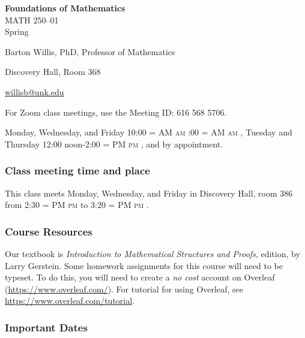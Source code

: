 \documentclass[12pt]{article}
\makeatletter
\newcounter{ex}\setcounter{ex}{0}
\renewenvironment{description}[0]{\begin{compactdesc}}{\end{compactdesc}}
\DeclareRobustCommand{\maybefakesc}[1]{%
  \ifnum\pdfstrcmp{\f@series}{\bfdefault}=\z@
    {\fontsize{\dimexpr0.8\dimexpr\f@size pt\relax}{0}\selectfont\uppercase{#1}}%
  \else
    \textsc{#1}%
  \fi
}
\newcommand\AM{\maybefakesc{am}\xspace}
\newcommand\PM{\maybefakesc{pm}\xspace}
\newcommand{\coursename}{Foundations of Mathematics}
\newcommand{\coursenumber}{MATH 250}
\newcommand{\sectionnumber}{01}
\newcommand{\term}{Spring }
\newcommand{\room}{Discovery Hall, room 386}
\newcommand{\meetingtime}{This class meets Monday, Wednesday, and Friday in \room \/  from 2:30\PM to 3:20\PM.}
\newcommand{\officehours}{Monday, Wednesday, and Friday 10:00\AM-11:00\AM,
    Tuesday and Thursday 12:00 noon-2:00\PM, and by appointment.}
\makeatother
\begin{document}
\cleanlookdateon%
\shortdate
\printyearoff
\large
\begin{center}
    \textbf{\coursename}  \\
    {\coursenumber--\sectionnumber} \\
     {\term \the\year} \\
\end{center}

\vskip0.25in
\normalsize


\begin{center}
\begin{description}
    \item[Instructor:] Barton Willis, PhD, Professor of Mathematics
    \item[Office:]  Discovery Hall, Room 368
    \item[\phone:]   
    \item[\Email:]    \href{mailto:willisb@unk.edu}{willisb@unk.edu}
    \item[Zoom for classes:] For Zoom class meetings, use the Meeting ID: 616 568 5706. 
    \item[Office Hours:] \officehours
  \end{description}
\end{center}

\subsubsection*{Class meeting time and place}

\meetingtime



\subsubsection*{Course Resources}

\noindent Our textbook is \emph{Introduction to Mathematical Structures and Proofs},  edition,  by  Larry Gerstein.
Some homework assignments for this course will need to be typeset. To do this, you will need to create a \emph{no cost} 
account on Overleaf (\url{https://www.overleaf.com/}).   For  tutorial for using Overleaf, see \url{https://www.overleaf.com/tutorial}.



\subsubsection*{Important Dates}
\end{document}
